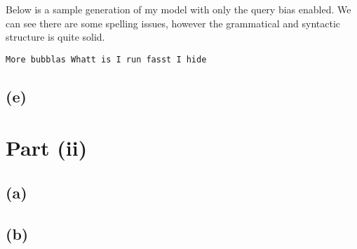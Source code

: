 \documentclass{article}  %
\begin{document}
	Below is a sample generation of my model with only the query bias enabled. We can see there are some spelling issues, however the grammatical and syntactic structure is quite solid.
	
	\verb|More bubblas Whatt is I run fasst I hide|
	
	\subsection*{(e)}
	
	
	
	\newpage
	
	\section*{Part (ii)}
	
	\subsection*{(a)}
	
	\subsection*{(b)}
	
\end{document}
